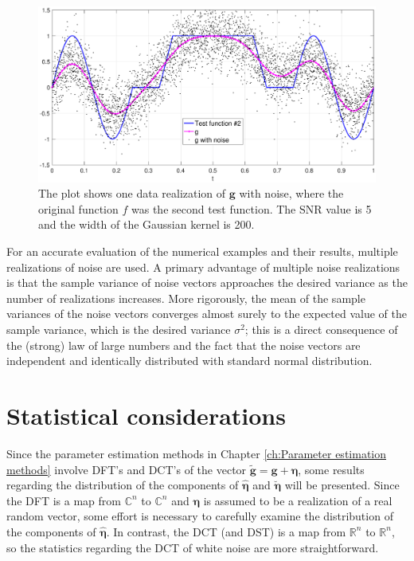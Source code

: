 \documentclass[12pt,notitlepage]{report}
\newcommand{\gVec}{\mathbf{g}}	%
\newcommand{\gnoiseVec}{\widetilde{\mathbf{g}}}	%
\newcommand{\dct}[1]{\breve{#1}}	%
\newcommand{\noise}{\eta}	%
\newcommand{\noiseSD}{\sigma}	%
\newcommand{\noiseVec}{\bm{\noise}}	%
\begin{document}
\begin{figure}
	\centerline{\includegraphics[scale = 0.45]{Figures/NoisePlot1D_F2_S05_W200.eps}}
\caption{The plot shows one data realization of $\gVec$ with noise, where the original function $f$ was the second test function. The SNR value is 5 and the width of the Gaussian kernel is 200.}
\label{NoisePlot1D_F2_S05_W200}
\end{figure}

For an accurate evaluation of the numerical examples and their results, multiple realizations of noise are used. A primary advantage of multiple noise realizations is that the sample variance of noise vectors approaches the desired variance as the number of realizations increases. More rigorously, the mean of the sample variances of the noise vectors converges almost surely to the expected value of the sample variance, which is the desired variance $\noiseSD^2$; this is a direct consequence of the (strong) law of large numbers and the fact that the noise vectors are independent and identically distributed with standard normal distribution. 

\chapter{Statistical considerations} \label{ch:Stats}

Since the parameter estimation methods in Chapter \ref{ch:Parameter estimation methods} involve DFT's and DCT's of the vector $\gnoiseVec = \gVec + \noiseVec$, some results regarding the distribution of the components of $\widehat{\noiseVec}$ and $\dct{\noiseVec}$ will be presented. Since the DFT is a map from $\mathbb{C}^n$ to $\mathbb{C}^n$ and $\noiseVec$ is assumed to be a realization of a real random vector, some effort is necessary to carefully examine the distribution of the components of $\widehat{\noiseVec}$. In contrast, the DCT (and DST) is a map from $\mathbb{R}^n$ to $\mathbb{R}^n$, so the statistics regarding the DCT of white noise are more straightforward.
\end{document}

